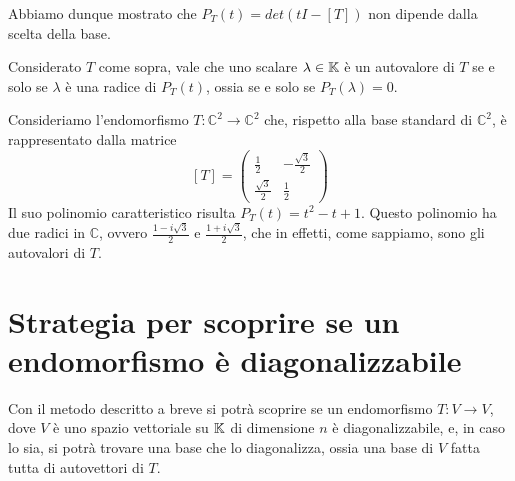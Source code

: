 Abbiamo dunque mostrato che $P_T(t) = det(tI - [T])$ non dipende dalla scelta della
base.

\begin{theorem}
	Considerato $T$ come sopra, vale che uno scalare $\lambda \in \mathbb{K}$ è un
	autovalore di $T$ se e solo se $\lambda$ è una radice di $P_T(t)$, ossia se e
	solo se $P_T(\lambda) = 0$.
\end{theorem}

\begin{example}
	Consideriamo l'endomorfismo $T : \mathbb{C}^2 \to \mathbb{C}^2$ che, rispetto
	alla base standard di $\mathbb{C}^2$, è rappresentato dalla matrice
	\[
		[T] = \begin{pmatrix}
			\frac{1}{2}        & -\frac{\sqrt{3}}{2} \\
			\frac{\sqrt{3}}{2} & \frac{1}{2}
		\end{pmatrix}
	\]
	Il suo polinomio caratteristico risulta $P_T(t) = t^2 - t + 1$. Questo polinomio
	ha due radici in $\mathbb{C}$, ovvero $\frac{1 - i\sqrt{3}}{2}$ e
	$\frac{1 + i\sqrt{3}}{2}$, che in effetti, come sappiamo, sono gli autovalori
	di $T$.
\end{example}


\section{Strategia per scoprire se un endomorfismo è diagonalizzabile}
Con il metodo descritto a breve si potrà scoprire se un endomorfismo
$T : V \to V$, dove $V$ è uno spazio vettoriale su $\mathbb{K}$ di dimensione $n$
è diagonalizzabile, e, in caso lo sia, si potrà trovare una base che lo diagonalizza,
ossia una base di $V$ fatta tutta di autovettori di $T$.


